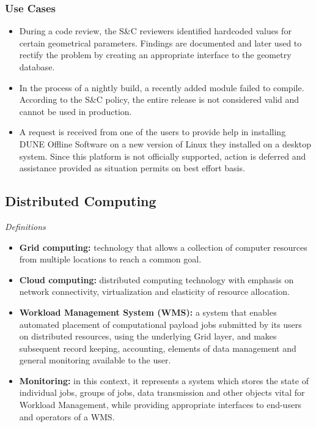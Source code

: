 \subsubsection{Use Cases}
\begin{itemize}
\item During a code review, the S\&C reviewers identified hardcoded values for certain geometrical parameters. Findings are documented and later used to rectify the problem by creating an appropriate interface to the geometry database.

\item In the process of a nightly build, a recently added module failed to compile. According to the S\&C policy, the entire release is not considered valid and cannot be used in production.

\item A request is received from one of the users to provide help in installing DUNE Offline Software on a new version of Linux they installed on a desktop system. Since this platform is not officially supported, action is deferred and assistance provided as situation permits on best effort basis.

\end{itemize}

\subsection{Distributed Computing}
\label{sec:dunedc}
\textit{Definitions}
\begin{itemize}
	\item \textbf{Grid computing:}  technology that allows a collection of computer resources from multiple locations to reach a common goal.
	
	\item \textbf{Cloud computing:} distributed computing technology with emphasis on network connectivity, virtualization and elasticity of resource allocation.
	
	\item \textbf{Workload Management System (WMS):} a system that enables automated placement of computational payload jobs submitted by its users on distributed resources, using the underlying Grid layer, and makes subsequent record keeping, accounting, elements of data management and general monitoring available to the user.
	
	\item \textbf{Monitoring:} in this context, it represents a system which stores the state of individual jobs, groups of jobs, data transmission and other objects vital for Workload Management, while providing appropriate interfaces to end-users and operators of a WMS.
\end{itemize}

